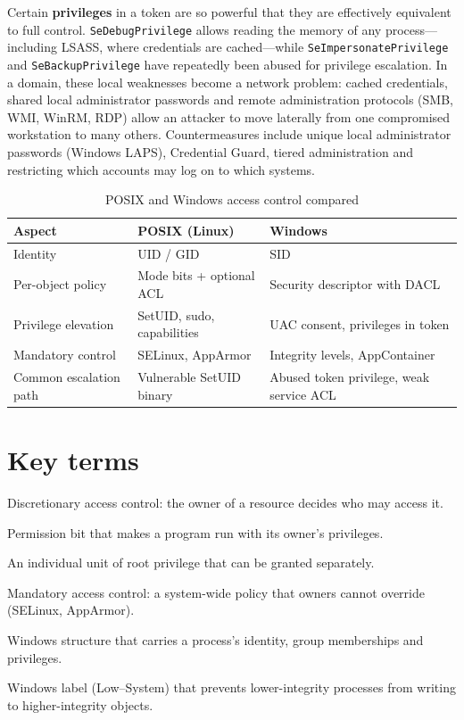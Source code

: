 \documentclass[11pt,openany]{book}
\begin{document}
Certain \textbf{privileges} in a token are so powerful that they are effectively equivalent to full control. \texttt{SeDebugPrivilege} allows reading the memory of any process—including LSASS, where credentials are cached—while \texttt{SeImpersonatePrivilege} and \texttt{SeBackupPrivilege} have repeatedly been abused for privilege escalation. In a domain, these local weaknesses become a network problem: cached credentials, shared local administrator passwords and remote administration protocols (SMB, WMI, WinRM, RDP) allow an attacker to move laterally from one compromised workstation to many others. Countermeasures include unique local administrator passwords (Windows LAPS), Credential Guard, tiered administration and restricting which accounts may log on to which systems.

\begin{table}[htbp]
  \centering\small
  \caption{POSIX and Windows access control compared}
  \begin{tabularx}{\linewidth}{>{\raggedright\arraybackslash}X >{\raggedright\arraybackslash}X >{\raggedright\arraybackslash}X}
    \toprule
    \textbf{Aspect} & \textbf{POSIX (Linux)} & \textbf{Windows} \\
    \midrule
    Identity & UID / GID & SID \\
    Per-object policy & Mode bits + optional ACL & Security descriptor with DACL \\
    Privilege elevation & SetUID, sudo, capabilities & UAC consent, privileges in token \\
    Mandatory control & SELinux, AppArmor & Integrity levels, AppContainer \\
    Common escalation path & Vulnerable SetUID binary & Abused token privilege, weak service ACL \\
    \bottomrule
  \end{tabularx}
\end{table}
\section*{Key terms}
\begin{description}[style=nextline,leftmargin=1.2em]
  \item[DAC] Discretionary access control: the owner of a resource decides who may access it.
  \item[SetUID] Permission bit that makes a program run with its owner's privileges.
  \item[Capability (Linux)] An individual unit of root privilege that can be granted separately.
  \item[MAC] Mandatory access control: a system-wide policy that owners cannot override (SELinux, AppArmor).
  \item[Access token] Windows structure that carries a process's identity, group memberships and privileges.
  \item[Integrity level] Windows label (Low–System) that prevents lower-integrity processes from writing to higher-integrity objects.
\end{description}
\end{document}
